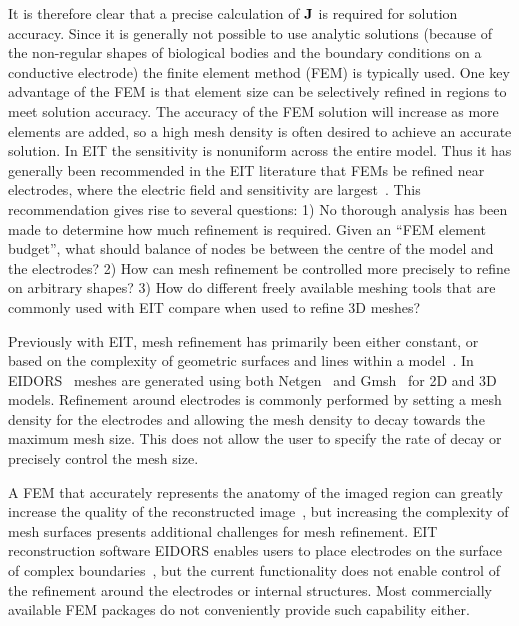 \documentclass[12pt]{iopart}
\begin{document}
It is therefore clear that a precise  calculation of $\bf J$ is
required for solution accuracy. Since it is generally not
possible to use analytic solutions (because of the non-regular
shapes of biological bodies and the boundary conditions on a
conductive electrode) the finite element method (FEM) is typically
used. 
One key advantage of the FEM is that element size can be
selectively refined in regions to meet solution accuracy. 
The accuracy of the FEM solution will increase as more elements are
added, so a high mesh density is often desired to achieve an 
accurate solution. In EIT the sensitivity is nonuniform 
across the entire model.
Thus
it has generally been recommended in the EIT literature 
that FEMs be refined near electrodes, where the electric 
field and sensitivity are largest~\parencite{adler_electrical_2017}. 
This recommendation gives rise to several questions: 
1) No thorough analysis has been made to determine how much 
refinement is required. Given an ``FEM element budget'', what should
balance of nodes be between the centre of the model and the electrodes?
2) How can mesh refinement be controlled more precisely 
to refine  on arbitrary shapes? 
3) How do different freely available meshing tools that are
commonly used with EIT compare when used to refine 3D meshes?

Previously with EIT, mesh refinement has primarily been either 
constant, or based on 
the complexity of geometric surfaces and lines within a model~\parencite{grychtol_fem_2013}.  
In EIDORS~\parencite{adler_uses_2006} meshes are generated using both 
Netgen~\parencite{schoberl_netgen_1997} and Gmsh~\parencite{geuzaine_gmsh_2009} 
for 2D and 3D models. 
Refinement around electrodes is commonly performed by 
setting a mesh density for the electrodes and allowing the mesh density to 
decay towards the maximum mesh size. This does not allow the user to specify 
the rate of decay or precisely control the mesh size.   

A FEM that accurately represents the anatomy of the imaged region 
can greatly increase the quality of the reconstructed image~\parencite{grychtol_impact_2012},
but increasing the complexity of mesh surfaces presents additional challenges for
mesh refinement.  EIT reconstruction software EIDORS enables users to place electrodes on the surface of complex 
boundaries~\parencite{grychtol_fem_2013}, but the current functionality does not  
enable control of the refinement around the electrodes or internal 
structures.
Most commercially available FEM packages
do not conveniently provide such capability either.
\end{document}
